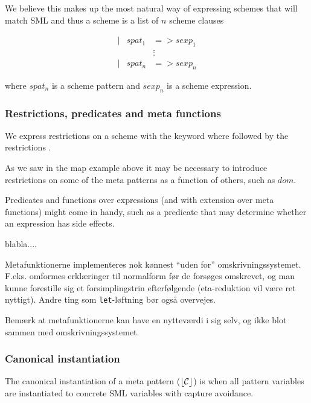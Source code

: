 We believe this makes up the most natural way of expressing schemes that will
match SML and thus a scheme is a list of $n$ scheme clauses

\begin{eqnarray*}[rqrl]
| & spat_1 & => sexp_1 \\
  &  & \vdots \\
| & spat_n & => sexp_n
\end{eqnarray*}

where $spat_n$ is a scheme pattern and $sexp_n$ is a scheme expression.


\subsubsection{Restrictions, predicates and meta functions}


We express restrictions on a scheme with the keyword \textsf{where} followed by
the restrictions . 

As we saw in the \textsf{map} example above it may be necessary to introduce
restrictions on some of the meta patterns as a function of others, such as
$dom$.

Predicates and functions over expressions (and with extension over meta
functions)  might come in handy, such as a
predicate that may determine whether an expression has side effects.

blabla....

Metafunktionerne implementeres nok kønnest ``uden for''
omskrivningssystemet. F.eks. omformes erklæringer til normalform før de
forsøges omskrevet, og man kunne forestille sig et forsimplingstrin
efterfølgende (eta-reduktion vil være ret nyttigt). Andre ting som
\texttt{let}-løftning bør også overvejes.

Bemærk at metafunktionerne kan have en nytteværdi i sig selv, og ikke blot
sammen med omskrivningssystemet.


\subsubsection{Canonical instantiation}
The canonical instantiation of a meta pattern ($\lfloor \mathcal{C} \rfloor$) is when
all pattern variables are instantiated to concrete SML variables with capture
avoidance. 

